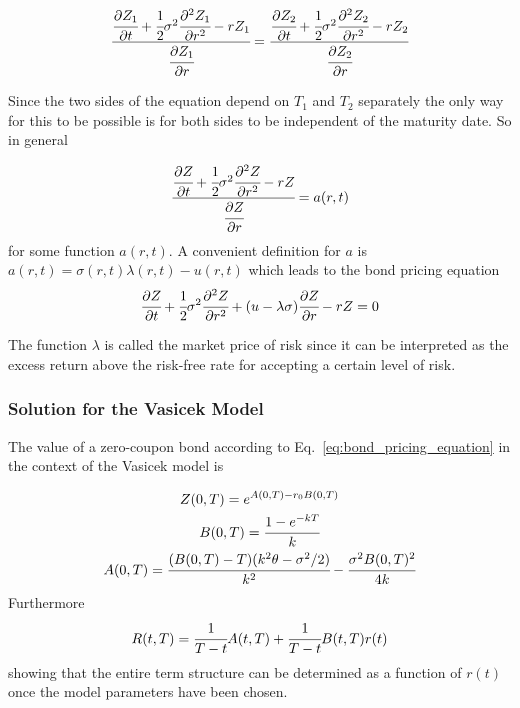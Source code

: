 \begin{equation*}
\cfrac{\cfrac{\partial Z_1}{\partial t} + \cfrac{1}{2}\sigma^2 \cfrac{\partial^2 Z_1}{\partial r^2} - rZ_1}{\cfrac{\partial Z_1}{\partial r}}=\cfrac{\cfrac{\partial Z_2}{\partial t} + \cfrac{1}{2}\sigma^2 \cfrac{\partial^2 Z_2}{\partial r^2} - rZ_2}{\cfrac{\partial Z_2}{\partial r}}
\end{equation*}

Since the two sides of the equation depend on $T_1$ and $T_2$ separately the only way for this to be possible is for both sides to be independent of the maturity date. So in general

\begin{equation*}
\cfrac{\cfrac{\partial Z}{\partial t} + \cfrac{1}{2}\sigma^2 \cfrac{\partial^2 Z}{\partial r^2} - rZ}{\cfrac{\partial Z}{\partial r}}= a(r, t)
\end{equation*}
for some function $a(r, t)$. A convenient definition for $a$ is $a(r, t) = \sigma(r, t)\lambda(r, t)-u(r, t)$ which leads to the bond pricing equation
\begin{equation}
\cfrac{\partial Z}{\partial t} + \cfrac{1}{2}\sigma^2 \cfrac{\partial^2 Z}{\partial r^2} + (u-\lambda\sigma)\cfrac{\partial Z}{\partial r}-rZ = 0
\label{eq:bond_pricing_equation}
\end{equation}

The function $\lambda$ is called the market price of risk since it can be interpreted as the excess return above the risk-free rate for accepting a certain level of risk.

\subsubsection{Solution for the Vasicek Model}
\label{solution-for-the-vasicek-model}
The value of a zero-coupon bond according to Eq.~\ref{eq:bond_pricing_equation} in the context of the Vasicek model is

\begin{equation} 
\begin{gathered}
Z(0, T) = e^{A(0,T)-r_0 B(0,T)} \\
B(0, T) = \cfrac{1-e^{-kT}}{k}\\
A(0, T) = \cfrac{(B(0, T)-T)(k^2\theta - \sigma^2/2)}{k^2} - \cfrac{\sigma^2 B(0, T)^2}{4k}
\label{eq:zcb_vasicek}
\end{gathered}
\end{equation}
Furthermore
\begin{equation}
R(t, T) = \cfrac{1}{T-t} A(t,T)+\cfrac{1}{T-t}B(t, T)r(t)
\label{eq:term_structure_vasicek}
\end{equation}
showing that the entire term structure can be determined as a function of $r(t)$ once the model parameters have been chosen.

